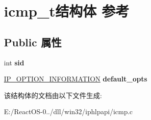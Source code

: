 \hypertarget{structicmp__t}{}\section{icmp\+\_\+t结构体 参考}
\label{structicmp__t}
\subsection*{Public 属性}
\begin{DoxyCompactItemize}
\item 
\mbox{\label{structicmp__t_a616ae43021dfc36b0682b5e6dd2c256f}} 
int {\bfseries sid}
\item 
\mbox{\label{structicmp__t_af6fe488c78a9824c2ddbdde1f49d901b}} 
\hyperlink{structip__option__information}{I\+P\+\_\+\+O\+P\+T\+I\+O\+N\+\_\+\+I\+N\+F\+O\+R\+M\+A\+T\+I\+ON} {\bfseries default\+\_\+opts}
\end{DoxyCompactItemize}


该结构体的文档由以下文件生成\+:\begin{DoxyCompactItemize}
\item 
E\+:/\+React\+O\+S-\/0../dll/win32/iphlpapi/icmp.\+c\end{DoxyCompactItemize}
